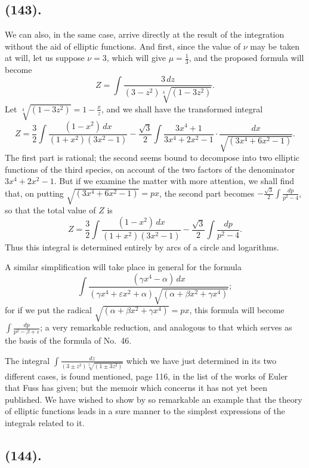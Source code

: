 \documentclass{article}
\begin{document}
\subsection*{(143).}

We can also, in the same case, arrive directly at the result of the integration without the aid of elliptic functions. And first, since the value of $\nu$ may be taken at will, let us suppose $\nu=3$, which will give $\mu=\frac{1}{3}$, and the proposed formula will become
\[ Z=\int\frac{3\,dz}{(3-z^{2})\sqrt[3]{(1-3z^{2})}}. \]
Let $\sqrt[3]{(1-3z^{2})}=1-\frac{x}{z}$, and we shall have the transformed integral
\[ Z=\frac{3}{2}\int\frac{(1-x^{2})\,dx}{(1+x^{2})(3x^{2}-1)}-\frac{\sqrt{3}}{2}\int\frac{3x^{4}+1}{3x^{4}+2x^{2}-1}\cdot\frac{dx}{\sqrt{(3x^{4}+6x^{2}-1)}}. \]
The first part is rational; the second seems bound to decompose into two elliptic functions of the third species, on account of the two factors of the denominator $3x^{4}+2x^{2}-1$. But if we examine the matter with more attention, we shall find that, on putting $\sqrt{(3x^{4}+6x^{2}-1)}=px$, the second part becomes $\displaystyle-\frac{\sqrt{3}}{2}\int\frac{dp}{p^{2}-4}$, so that the total value of $Z$ is
\[ Z=\frac{3}{2}\int\frac{(1-x^{2})\,dx}{(1+x^{2})(3x^{2}-1)}-\frac{\sqrt{3}}{2}\int\frac{dp}{p^{2}-4}. \]
Thus this integral is determined entirely by arcs of a circle and logarithms.


A similar simplification will take place in general for the formula
\[ \int\frac{(\gamma x^{4}-\alpha)\,dx}{(\gamma x^{4}+\varepsilon x^{2}+\alpha)\sqrt{(\alpha+\beta x^{2}+\gamma x^{4})}}; \]
for if we put the radical $\sqrt{(\alpha+\beta x^{2}+\gamma x^{4})}=px$, this formula will become $\displaystyle\int\frac{dp}{p^{2}-\beta+\varepsilon}$; a very remarkable reduction, and analogous to that which serves as the basis of the formula of No.~46.

The integral $\displaystyle\int\frac{dz}{(3\pm z^{2})\sqrt[3]{(1\pm 3z^{2})}}$ which we have just determined in its two different cases, is found mentioned, page 116, in the list of the works of Euler that Fuss has given; but the memoir which concerns it has not yet been published. We have wished to show by so remarkable an example that the theory of elliptic functions leads in a sure manner to the simplest expressions of the integrals related to it.

\subsection*{(144).}
\end{document}
